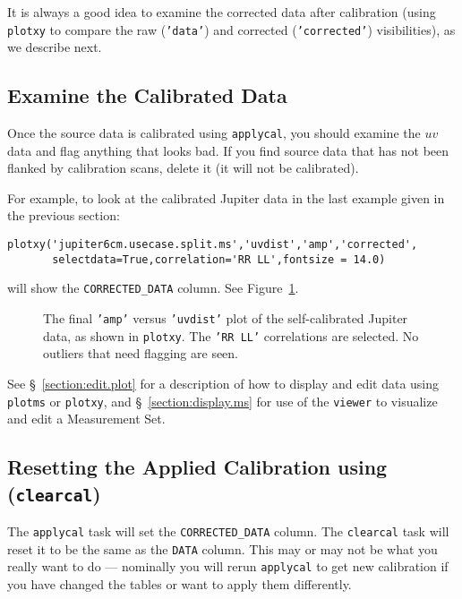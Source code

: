 It is always a good idea to examine the corrected data after calibration
(using {\tt plotxy} to compare the raw ({\tt 'data'}) and corrected 
({\tt 'corrected'}) visibilities), as we describe next.

\subsection{Examine the Calibrated Data}
\label{section:cal.correct.exam}

Once the source data is calibrated using {\tt applycal}, 
you should examine the $uv$ data and flag anything that looks bad.  If
you find source data that has not been flanked by calibration scans,
delete it (it will not be calibrated).  

For example, to look at the calibrated Jupiter data in the last
example given in the previous section:
\small
\begin{verbatim}
plotxy('jupiter6cm.usecase.split.ms','uvdist','amp','corrected',
       selectdata=True,correlation='RR LL',fontsize = 14.0)
\end{verbatim}
\normalsize
will show the {\tt CORRECTED\_DATA} column.  See 
Figure~\ref{fig:applycal_jupiter}.

\begin{figure}[h!]
\begin{center}
\caption{\label{fig:applycal_jupiter} The final {\tt 'amp'} versus
{\tt 'uvdist'} plot of the self-calibrated Jupiter data, as shown
in {\tt plotxy}.  The {\tt 'RR LL'} correlations are selected.
No outliers that need flagging are seen. }
\hrulefill
\end{center}
\end{figure}

See \S~\ref{section:edit.plot} for a description of how to display and edit 
data using {\tt plotms} or {\tt plotxy}, and \S~\ref{section:display.ms} for use of
the {\tt viewer} to visualize and edit a Measurement Set.

\subsection{Resetting the Applied Calibration using ({\tt clearcal})}
\label{section:cal.correct.clearcal}

The {\tt applycal} task will set the {\tt CORRECTED\_DATA} column.
The {\tt clearcal} task will reset it to be the same as
the {\tt DATA} column.  This may or may not be what you really
want to do --- nominally you will rerun {\tt applycal} to get
new calibration if you have changed the tables or want to apply them
differently.

